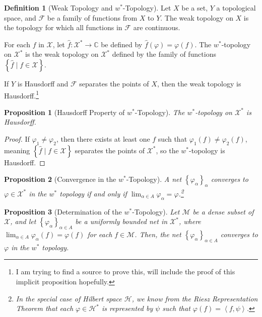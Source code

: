 \documentclass[10pt]{extarticle}
\newcommand{\C}{\mathbb{C}}
\newcommand{\iprod}[2]{\left\langle #1,#2\right\rangle}
\newcommand{\set}[1]{\left\{#1\right\}}
\theoremstyle{plain}
\newtheorem*{proposition}{Proposition}
\theoremstyle{definition}
\newtheorem*{definition}{Definition}
\theoremstyle{note}
\renewcommand{\newline}{\hfill\break}
\begin{document}
\begin{definition}[Weak Topology and $w^{\ast}$-Topology]
Let $X$ be a set, $Y$ a topological space, and $\mathcal{F}$ be a family of functions from $X$ to $Y$. The weak topology on $X$ is the topology for which all functions in $\mathcal{F}$ are continuous.\newline

For each $f$ in $\mathcal{X}$, let $\hat{f}: \mathcal{X}^{\ast}\rightarrow \C$ be defined by $\hat{f}(\varphi) = \varphi(f)$. The $w^{\ast}$-topology on $\mathcal{X}^{\ast}$ is the weak topology on $\mathcal{X}^{\ast}$ defined by the family of functions $\set{\hat{f}\mid f\in \mathcal{X}}$.\newline

If $Y$ is Hausdorff and $\mathcal{F}$ separates the points of $X$, then the weak topology is Hausdorff.\footnote{I am trying to find a source to prove this, will include the proof of this implicit proposition hopefully.}
\end{definition}
\begin{proposition}[Hausdorff Property of $w^{\ast}$-Topology]
  The $w^{\ast}$-topology on $\mathcal{X}^{\ast}$ is Hausdorff.
\end{proposition}
\begin{proof}
  If $\varphi_1 \neq \varphi_2$, then there exists at least one $f$ such that $\varphi_1(f) \neq \varphi_2(f)$, meaning $\set{\hat{f}\mid f\in \mathcal{X}}$ separates the points of $\mathcal{X}^{\ast}$, so the $w^{\ast}$-topology is Hausdorff.
\end{proof}
\begin{proposition}[Convergence in the $w^{\ast}$-Topology]
  A net $\set{\varphi_{\alpha}}_{\alpha}$ converges to $\varphi\in\mathcal{X}^{\ast}$ in the $w^{\ast}$ topology if and only if $\lim_{\alpha \in A}\varphi_{\alpha} = \varphi$.\footnote{In the special case of Hilbert space $\mathcal{H}$, we know from the Riesz Representation Theorem that each $\varphi\in \mathcal{H}^{\ast}$ is represented by $\psi$ such that $\varphi(f) = \iprod{f}{\psi}$.}
\end{proposition}
\begin{proposition}[Determination of the $w^{\ast}$-Topology]
  Let $\mathcal{M}$ be a dense subset of $\mathcal{X}$, and let $\set{\varphi_{\alpha}}_{\alpha\in A}$ be a uniformly bounded net in $\mathcal{X}^{\ast}$, where $\lim_{\alpha \in A}\varphi_{\alpha}(f) = \varphi(f)$ for each $f\in \mathcal{M}$. Then, the net $\set{\varphi_{\alpha}}_{\alpha \in A}$ converges to $\varphi$ in the $w^{\ast}$ topology.
\end{proposition}
\end{document}
